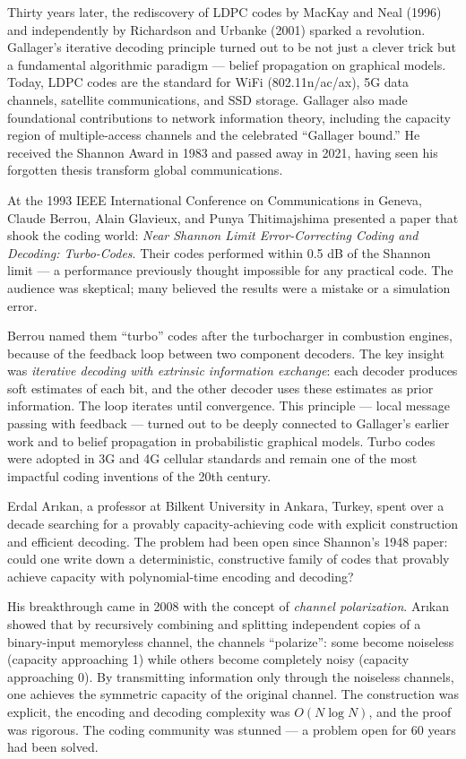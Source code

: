 Thirty years later, the rediscovery of LDPC codes by MacKay and Neal (1996) and independently by Richardson and Urbanke (2001) sparked a revolution. Gallager's iterative decoding principle turned out to be not just a clever trick but a fundamental algorithmic paradigm — belief propagation on graphical models. Today, LDPC codes are the standard for WiFi (802.11n/ac/ax), 5G data channels, satellite communications, and SSD storage. Gallager also made foundational contributions to network information theory, including the capacity region of multiple-access channels and the celebrated ``Gallager bound.'' He received the Shannon Award in 1983 and passed away in 2021, having seen his forgotten thesis transform global communications.

At the 1993 IEEE International Conference on Communications in Geneva, Claude Berrou, Alain Glavieux, and Punya Thitimajshima presented a paper that shook the coding world: \emph{Near Shannon Limit Error-Correcting Coding and Decoding: Turbo-Codes}. Their codes performed within 0.5 dB of the Shannon limit — a performance previously thought impossible for any practical code. The audience was skeptical; many believed the results were a mistake or a simulation error.

Berrou named them ``turbo'' codes after the turbocharger in combustion engines, because of the feedback loop between two component decoders. The key insight was \emph{iterative decoding with extrinsic information exchange}: each decoder produces soft estimates of each bit, and the other decoder uses these estimates as prior information. The loop iterates until convergence. This principle — local message passing with feedback — turned out to be deeply connected to Gallager's earlier work and to belief propagation in probabilistic graphical models. Turbo codes were adopted in 3G and 4G cellular standards and remain one of the most impactful coding inventions of the 20th century.

Erdal Arıkan, a professor at Bilkent University in Ankara, Turkey, spent over a decade searching for a provably capacity-achieving code with explicit construction and efficient decoding. The problem had been open since Shannon's 1948 paper: could one write down a deterministic, constructive family of codes that provably achieve capacity with polynomial-time encoding and decoding?

His breakthrough came in 2008 with the concept of \emph{channel polarization}. Arıkan showed that by recursively combining and splitting independent copies of a binary-input memoryless channel, the channels ``polarize'': some become noiseless (capacity approaching 1) while others become completely noisy (capacity approaching 0). By transmitting information only through the noiseless channels, one achieves the symmetric capacity of the original channel. The construction was explicit, the encoding and decoding complexity was $O(N \log N)$, and the proof was rigorous. The coding community was stunned — a problem open for 60 years had been solved.

